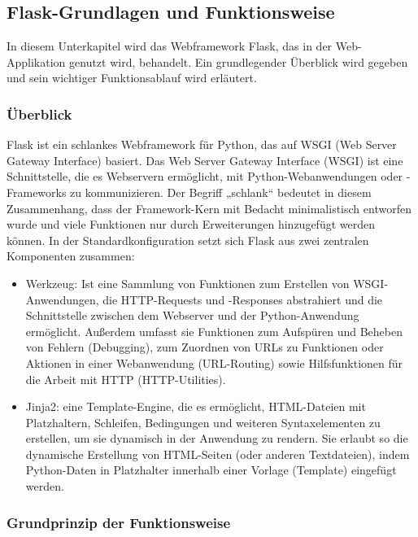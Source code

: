\subsection{Flask-Grundlagen und Funktionsweise}\label{subsec:flask-grundlagen-und-funktionsweise}

In diesem Unterkapitel wird das Webframework Flask, das in der Web-Applikation genutzt wird, behandelt.
Ein grundlegender Überblick wird gegeben und sein wichtiger Funktionsablauf wird erläutert.

\subsubsection{Überblick}

Flask ist ein schlankes Webframework für Python, das auf WSGI (Web Server Gateway Interface) basiert.
Das Web Server Gateway Interface (WSGI) ist eine Schnittstelle, die es Webservern ermöglicht, mit Python-Webanwendungen oder -Frameworks zu kommunizieren.
Der Begriff „schlank“ bedeutet in diesem Zusammenhang, dass der Framework-Kern mit Bedacht minimalistisch entworfen wurde und viele Funktionen nur durch Erweiterungen hinzugefügt werden können.
In der Standardkonfiguration setzt sich Flask aus zwei zentralen Komponenten zusammen: \cite{FlaskDocumentation}
\begin{itemize}

    \item Werkzeug: Ist eine Sammlung von Funktionen zum Erstellen von WSGI-Anwendungen, die HTTP-Requests und -Responses abstrahiert und die Schnittstelle zwischen dem Webserver und der Python-Anwendung ermöglicht.  Außerdem umfasst sie Funktionen zum Aufspüren und Beheben von Fehlern (Debugging), zum Zuordnen von URLs zu Funktionen oder Aktionen in einer Webanwendung (URL-Routing) sowie Hilfsfunktionen für die Arbeit mit HTTP (HTTP-Utilities).

    \item Jinja2: eine Template-Engine, die es ermöglicht, HTML-Dateien mit Platzhaltern, Schleifen, Bedingungen und weiteren Syntaxelementen zu erstellen, um sie dynamisch in der Anwendung zu rendern. Sie erlaubt so die dynamische Erstellung von HTML-Seiten (oder anderen Textdateien), indem Python-Daten in Platzhalter innerhalb einer Vorlage (Template) eingefügt werden.

\end{itemize}


\subsubsection{Grundprinzip der Funktionsweise}

